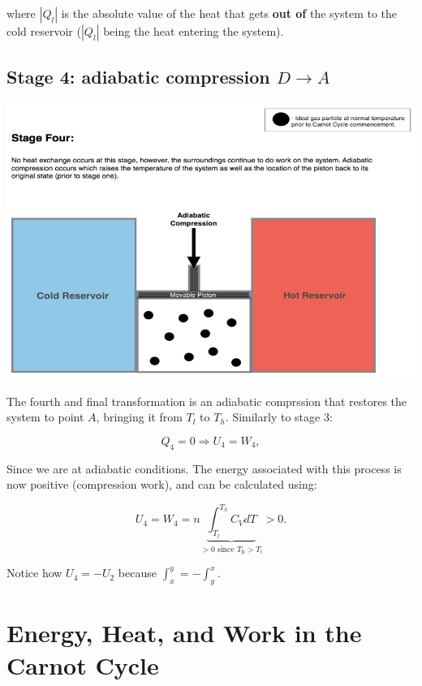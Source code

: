 \documentclass[
]{book}
\theoremstyle{definition}
\theoremstyle{definition}
\theoremstyle{definition}
\theoremstyle{remark}
\begin{document}
where \(\left| Q_l \right|\) is the absolute value of the heat that gets \textbf{out of} the system to the cold reservoir (\(\left| Q_l \right|\) being the heat entering the system).

\hypertarget{CCstage4}{%
\subsection{\texorpdfstring{Stage 4: adiabatic compression \(D \rightarrow A\)}{Stage 4: adiabatic compression D \textbackslash rightarrow A}}\label{CCstage4}}

\begin{center}\includegraphics[width=0.7\linewidth]{./img/OEP_Figures.007d} \end{center}

The fourth and final transformation is an adiabatic comprssion that restores the system to point \(A\), bringing it from \(T_l\) to \(T_h\). Similarly to stage 3:

\begin{equation}
Q_4 = 0 \Rightarrow U_4 = W_4,
  \label{eq:CCst4}
\end{equation}

Since we are at adiabatic conditions. The energy associated with this process is now positive (compression work), and can be calculated using:

\begin{equation}
U_4 = W_4 = n \underbrace{\int_{T_l}^{T_h} C_V dT}_{>0 \text{ since } T_\mathrm{h}>T_\mathrm{l}} > 0.
  \label{eq:CCst4b}
\end{equation}

Notice how \(U_4 = -U_2\) because \(\int_x^y=-\int_y^x\).

\hypertarget{UWQCarnot}{%
\section{Energy, Heat, and Work in the Carnot Cycle}\label{UWQCarnot}}
\end{document}
